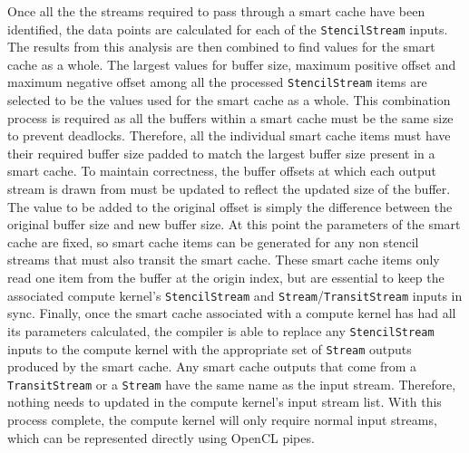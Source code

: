 \documentclass{mpaper}
\begin{document}
Once all the the streams required to pass through a smart cache have been identified, the data points are calculated for each of the \texttt{StencilStream} inputs.
The results from this analysis are then combined to find values for the smart cache as a whole.
The largest values for buffer size, maximum positive offset and maximum negative offset among all the processed \texttt{StencilStream} items are selected to be the values used for the smart cache as a whole.
This combination process is required as all the buffers within a smart cache must be the same size to prevent deadlocks.
Therefore, all the individual smart cache items must have their required buffer size padded to match the largest buffer size present in a smart cache.
To maintain correctness, the buffer offsets at which each output stream is drawn from must be updated to reflect the updated size of the buffer.
The value to be added to the original offset is simply the difference between the original buffer size and new buffer size.
At this point the parameters of the smart cache are fixed, so smart cache items can be generated for any non stencil streams that must also transit the smart cache.
These smart cache items only read one item from the buffer at the origin index, but are essential to keep the associated compute kernel's \texttt{StencilStream} and \texttt{Stream}/\texttt{TransitStream} inputs in sync.
Finally, once the smart cache associated with a compute kernel has had all its parameters calculated, the compiler is able to replace any \texttt{StencilStream} inputs to the compute kernel with the appropriate set of \texttt{Stream} outputs produced by the smart cache. 
Any smart cache outputs that come from a \texttt{TransitStream} or a \texttt{Stream} have the same name as the input stream.
Therefore, nothing needs to updated in the compute kernel's input stream list.
With this process complete, the compute kernel will only require normal input streams, which can be represented directly using OpenCL pipes. 
\end{document}
